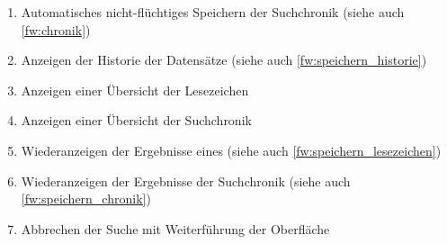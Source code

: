 \begin{enumerate} [label=\bfseries /FW \arabic*0/, leftmargin=*]
	\item Automatisches nicht-flüchtiges Speichern der \gls{Suchchronik} (siehe auch \ref{fw:chronik}) \label{fw:speichern_chronik}
	\item Anzeigen der Historie der Datensätze (siehe auch \ref{fw:speichern_historie}) \label{fw:historie_uebersicht}
	\item Anzeigen einer Übersicht der \gls{Lesezeichen} \label{fw:lesezeichen_uebersicht}
	\item Anzeigen einer Übersicht der \gls{Suchchronik} \label{fw:chronik_uebersicht}
	\item Wiederanzeigen der Ergebnisse eines  (siehe auch \ref{fw:speichern_lesezeichen}) \label{fw:lesezeichen}
	\item Wiederanzeigen der Ergebnisse der \gls{Suchchronik} (siehe auch \ref{fw:speichern_chronik}) \label{fw:chronik}
	\newline
	\item Abbrechen der Suche mit Weiterführung der Oberfläche \label{fw:suche_abbrechen}
\end{enumerate}
\pagebreak
